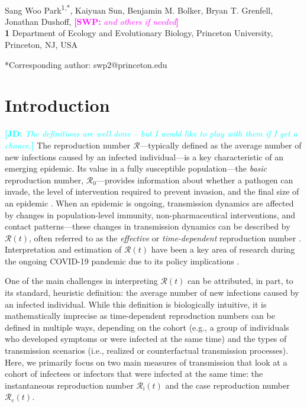 \documentclass[12pt]{article}
\date{\today}
\newcommand{\comment}{\showcomment}
\newcommand{\showcomment}[3]{\textcolor{#1}{\textbf{[#2: }\textsl{#3}\textbf{]}}}
\newcommand{\jd}[1]{\comment{cyan}{JD}{#1}}
\newcommand{\swp}[1]{\comment{magenta}{SWP}{#1}}
\newcommand{\Rx}[1]{\ensuremath{{\mathcal R}_{#1}}\xspace}
\newcommand{\Ro}{\Rx{0}}
\newcommand{\Rc}{\Rx{\mathrm{c}}}
\newcommand{\Ri}{\Rx{\mathrm{i}}}
\newcommand{\RR}{\ensuremath{{\mathcal R}}\xspace}
\begin{document}
\begin{flushleft}{
	\Large
	\textbf{}
}
\newline
\\
Sang Woo Park\textsuperscript{1,*}, Kaiyuan Sun, Benjamin M. Bolker, Bryan T. Grenfell, Jonathan Dushoff, \swp{and others if needed}
\\
\bigskip
\textbf{1} Department of Ecology and Evolutionary Biology, Princeton University, Princeton, NJ, USA
\\
\bigskip

*Corresponding author: swp2@princeton.edu
\end{flushleft}

\section{Introduction}

\jd{The definitions are well done -- but I would like to play with them if I get a chance.}
The reproduction number \RR---typically defined as the average number of new infections caused by an infected individual---is a key characteristic of an emerging epidemic.
Its value in a fully susceptible population---the \emph{basic} reproduction number, \Ro---provides information about whether a pathogen can invade, the level of intervention required to prevent invasion, and the final size of an epidemic \citep{diekmann1990definition,anderson1991infectious}.
When an epidemic is ongoing, transmission dynamics are affected by changes in population-level immunity, non-pharmaceutical interventions, and contact patterns---these changes in transmission dynamics can be described by $\RR(t)$, often referred to as the \emph{effective} or \emph{time-dependent} reproduction number \citep{wallinga2004different, fraser2007estimating, cori2013new}.
Interpretation and estimation of $\RR(t)$ have been a key area of research during the ongoing COVID-19 pandemic due to its policy implications \citep{pan2020association,flaxman2020estimating,gostic2020practical}.

One of the main challenges in interpreting $\RR(t)$ can be attributed, in part, to its standard, heuristic definition: the average number of new infections caused by an infected individual.
While this definition is biologically intuitive, it is mathematically imprecise as time-dependent reproduction numbers can be defined in multiple ways, depending on the cohort (e.g., a group of individuals who developed symptoms or were infected at the same time) and the types of transmission scenarios (i.e., realized or counterfactual transmission processes).
Here, we primarily focus on two main measures of transmission that look at a cohort of infectees or infectors that were infected at the same time: the instantaneous reproduction number $\Ri(t)$ and the case reproduction number $\Rc(t)$.
\end{document}
